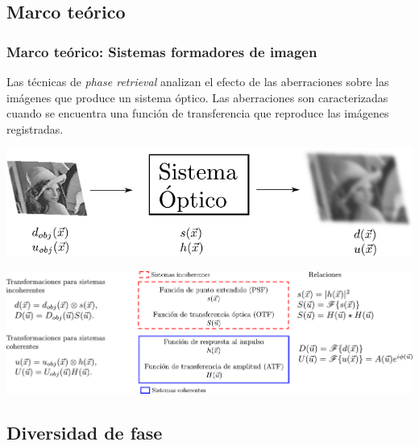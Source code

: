 \documentclass[serif,8pt]{beamer}
\begin{document}
		\subsection{Marco teórico}
		\begin{frame}
		\frametitle{Marco teórico: Sistemas formadores de imagen}

		\begin{multicols}{2}
		\justifying Las técnicas de \textit{phase retrieval} analizan el efecto de las aberraciones sobre las imágenes que produce un sistema óptico. Las aberraciones son caracterizadas cuando se encuentra una función de transferencia que
reproduce las imágenes registradas.

		\newpage
		\vspace*{10pt}
		\includegraphics[scale=0.45]{img/sisforim.pdf}
		\end{multicols}
		\vspace{10pt}
		
		\hspace*{-20pt}\includegraphics[scale=0.45]{img/Transformaciones.pdf}

		\end{frame}
		
		\subsection{Diversidad de fase}
		
\end{document}
